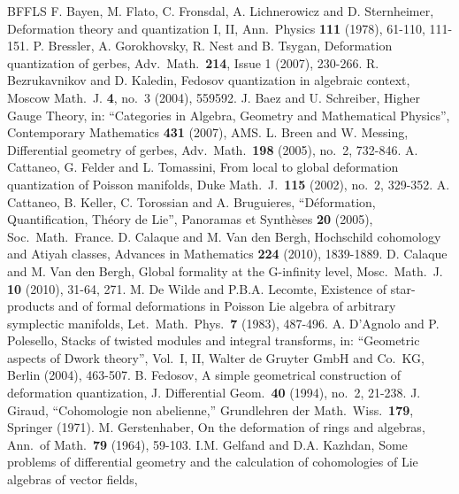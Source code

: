 \documentclass{conm-p-l}
\theoremstyle{definition}
\numberwithin{equation}{section}
\begin{document}

\begin{thebibliography}{BFFLS}
 F. Bayen, M. Flato, C. Fronsdal, 
    A. Lichnerowicz and D. Sternheimer,
    Deformation theory and quantization I, II, Ann.\ Physics
    {\bf 111} (1978), 61-110, 111-151.
 P. Bressler, A. Gorokhovsky, R. Nest and
	B. Tsygan, Deformation quantization of gerbes,
	Adv.\ Math.\ {\bf 214}, Issue 1 (2007), 230-266.
 R. Bezrukavnikov and D. Kaledin, 
    Fedosov quantization in algebraic context, 
    Moscow Math.\ J. {\bf 4}, no.\ 3 (2004), 559592.
 J. Baez and U. Schreiber, Higher Gauge Theory, 
  in: ``Categories in Algebra, Geometry and Mathematical Physics'',
  Contemporary Mathematics {\bf 431} (2007), AMS.
 L. Breen and W. Messing, 
    Differential geometry of gerbes,
    Adv.\ Math.\ {\bf 198} (2005), no.\ 2, 732-846.
 A. Cattaneo, G. Felder and L. Tomassini, 
    From local to global deformation quantization of Poisson 
    manifolds, Duke Math.\ J.\ \textbf{115} (2002), no.\ 2, 329-352.
 A. Cattaneo, B. Keller, C. Torossian and
    A. Bruguieres, 
    ``D\'eformation, Quantification, Th\'eory de Lie'',
    Panoramas et Synth\`eses {\bf 20} (2005), Soc.\ Math.\ France.
 D. Calaque and M. Van den Bergh,
	Hochschild cohomology and Atiyah classes,
  Advances in Mathematics {\bf 224} (2010), 1839-1889.
 D. Calaque and M. Van den Bergh,
    Global formality at the G-infinity level, 
  Mosc.\ Math.\ J. {\bf 10} (2010), 31-64, 271.
 M. De Wilde and P.B.A. Lecomte, 
    Existence of star-products and of formal deformations in 
    Poisson Lie algebra of arbitrary symplectic manifolds, Let.\ 
    Math.\ Phys.\ {\bf 7} (1983), 487-496.
  A. D'Agnolo and P. Polesello,
    Stacks of twisted modules and integral transforms,
  in: ``Geometric aspects of Dwork theory'', Vol.\ I, II, Walter de Gruyter GmbH
  and Co.\ KG, Berlin (2004), 463-507.
 B. Fedosov, 
    A simple geometrical construction of deformation quantization,
    J. Differential Geom.\ {\bf 40} (1994), no.\ 2, 21-238. 
 J. Giraud, 
    ``Cohomologie non abelienne,'' 
    Grundlehren der Math.\ Wiss.\ {\bf 179}, Springer (1971).
 M. Gerstenhaber,
    On the deformation of rings and algebras,
    Ann.\ of Math.\ {\bf 79} (1964), 59-103.
 I.M. Gelfand and D.A. Kazhdan, 
    Some problems of differential geometry and the calculation of 
    cohomologies of Lie algebras of vector fields, 

\end{thebibliography}
\end{document}
